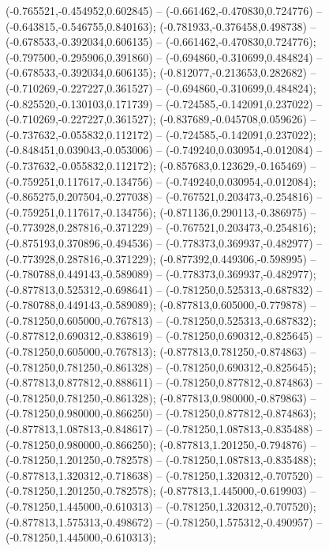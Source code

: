  (-0.765521,-0.454952,0.602845) -- (-0.661462,-0.470830,0.724776) -- (-0.643815,-0.546755,0.840163);
 (-0.781933,-0.376458,0.498738) -- (-0.678533,-0.392034,0.606135) -- (-0.661462,-0.470830,0.724776);
 (-0.797500,-0.295906,0.391860) -- (-0.694860,-0.310699,0.484824) -- (-0.678533,-0.392034,0.606135);
 (-0.812077,-0.213653,0.282682) -- (-0.710269,-0.227227,0.361527) -- (-0.694860,-0.310699,0.484824);
 (-0.825520,-0.130103,0.171739) -- (-0.724585,-0.142091,0.237022) -- (-0.710269,-0.227227,0.361527);
 (-0.837689,-0.045708,0.059626) -- (-0.737632,-0.055832,0.112172) -- (-0.724585,-0.142091,0.237022);
 (-0.848451,0.039043,-0.053006) -- (-0.749240,0.030954,-0.012084) -- (-0.737632,-0.055832,0.112172);
 (-0.857683,0.123629,-0.165469) -- (-0.759251,0.117617,-0.134756) -- (-0.749240,0.030954,-0.012084);
 (-0.865275,0.207504,-0.277038) -- (-0.767521,0.203473,-0.254816) -- (-0.759251,0.117617,-0.134756);
 (-0.871136,0.290113,-0.386975) -- (-0.773928,0.287816,-0.371229) -- (-0.767521,0.203473,-0.254816);
 (-0.875193,0.370896,-0.494536) -- (-0.778373,0.369937,-0.482977) -- (-0.773928,0.287816,-0.371229);
 (-0.877392,0.449306,-0.598995) -- (-0.780788,0.449143,-0.589089) -- (-0.778373,0.369937,-0.482977);
 (-0.877813,0.525312,-0.698641) -- (-0.781250,0.525313,-0.687832) -- (-0.780788,0.449143,-0.589089);
 (-0.877813,0.605000,-0.779878) -- (-0.781250,0.605000,-0.767813) -- (-0.781250,0.525313,-0.687832);
 (-0.877812,0.690312,-0.838619) -- (-0.781250,0.690312,-0.825645) -- (-0.781250,0.605000,-0.767813);
 (-0.877813,0.781250,-0.874863) -- (-0.781250,0.781250,-0.861328) -- (-0.781250,0.690312,-0.825645);
 (-0.877813,0.877812,-0.888611) -- (-0.781250,0.877812,-0.874863) -- (-0.781250,0.781250,-0.861328);
 (-0.877813,0.980000,-0.879863) -- (-0.781250,0.980000,-0.866250) -- (-0.781250,0.877812,-0.874863);
 (-0.877813,1.087813,-0.848617) -- (-0.781250,1.087813,-0.835488) -- (-0.781250,0.980000,-0.866250);
 (-0.877813,1.201250,-0.794876) -- (-0.781250,1.201250,-0.782578) -- (-0.781250,1.087813,-0.835488);
 (-0.877813,1.320312,-0.718638) -- (-0.781250,1.320312,-0.707520) -- (-0.781250,1.201250,-0.782578);
 (-0.877813,1.445000,-0.619903) -- (-0.781250,1.445000,-0.610313) -- (-0.781250,1.320312,-0.707520);
 (-0.877813,1.575313,-0.498672) -- (-0.781250,1.575312,-0.490957) -- (-0.781250,1.445000,-0.610313);
